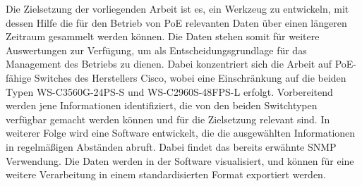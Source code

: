 Die Zielsetzung der vorliegenden Arbeit ist es, ein Werkzeug zu entwickeln, mit dessen Hilfe die für den Betrieb von PoE relevanten Daten über einen längeren Zeitraum gesammelt werden können. Die Daten stehen somit für weitere Auswertungen zur Verfügung, um als Entscheidungsgrundlage für das Management des Betriebs zu dienen. Dabei konzentriert sich die Arbeit auf PoE-fähige Switches des Herstellers Cisco, wobei eine Einschränkung auf die beiden Typen WS-C3560G-24PS-S und WS-C2960S-48FPS-L erfolgt. Vorbereitend werden jene Informationen identifiziert, die von den beiden Switchtypen verfügbar gemacht werden können und für die Zielsetzung relevant sind. In weiterer Folge wird eine Software entwickelt, die die ausgewählten Informationen in regelmäßigen Abständen abruft. Dabei findet das bereits erwähnte SNMP Verwendung. Die Daten werden in der Software visualisiert, und können für eine weitere Verarbeitung in einem standardisierten Format exportiert werden.


